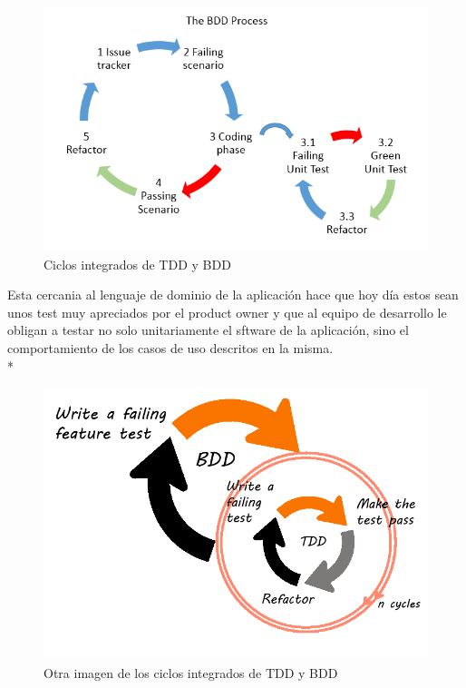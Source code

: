 \documentclass[../pfc.tex]{subfiles}
\begin{document}
		\begin{figure}[H]
			\centering
			\includegraphics[width=1\linewidth]{../images/bdd1}
			\caption{Ciclos integrados de TDD y BDD }
			\label{fig:Ciclo de BDD y TDD}
		\end{figure}
	
	Esta cercania al lenguaje de dominio de la aplicación hace que hoy día estos sean unos test muy apreciados por el product owner y que al equipo de desarrollo le obligan a testar no solo unitariamente el sftware de la aplicación, sino el comportamiento de los casos de uso descritos en la misma.\\* 
	
	\begin{figure}[H]
		\centering
		\includegraphics[width=1\linewidth]{../images/bdd2}
		\caption{Otra imagen de los ciclos integrados de TDD y BDD }
		\label{fig:Ciclo de BDD y TDD otro ejemplo}
	\end{figure}
		
\end{document}
